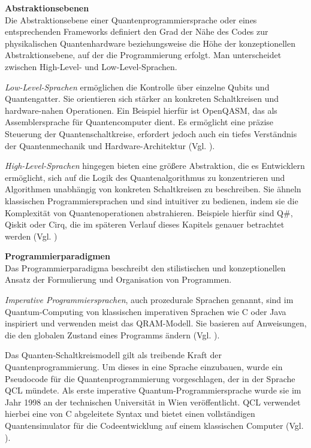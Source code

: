 \textbf{Abstraktionsebenen}\\ 
Die Abstraktionsebene einer Quantenprogrammiersprache oder eines entsprechenden Frameworks definiert den Grad der Nähe des Codes zur physikalischen Quantenhardware beziehungsweise die Höhe der konzeptionellen Abstraktionsebene, auf der die Programmierung erfolgt.
Man unterscheidet zwischen High-Level- und Low-Level-Sprachen. 

\textit{Low-Level-Sprachen} ermöglichen die Kontrolle über einzelne Qubits und Quantengatter. Sie orientieren sich stärker an konkreten Schaltkreisen und hardware-nahen Operationen. Ein Beispiel hierfür ist OpenQASM, das als Assemblersprache für Quantencomputer dient. Es ermöglicht eine präzise Steuerung der Quantenschaltkreise, erfordert jedoch auch ein tiefes Verständnis der Quantenmechanik und Hardware-Architektur (Vgl. \cite{cross_open_2017}).

\textit{High-Level-Sprachen} hingegen bieten eine größere Abstraktion, die es Entwicklern ermöglicht, sich auf die Logik des Quantenalgorithmus zu konzentrieren und Algorithmen unabhängig von konkreten Schaltkreisen zu beschreiben. Sie ähneln klassischen Programmiersprachen und sind intuitiver zu bedienen, indem sie die Komplexität von Quantenoperationen abstrahieren. Beispiele hierfür sind Q\#, Qiskit oder Cirq, die im späteren Verlauf dieses Kapitels genauer betrachtet werden (Vgl. \cite{singh_survey_2024})

\textbf{Programmierparadigmen}\\ 
Das Programmierparadigma beschreibt den stilistischen und konzeptionellen Ansatz der Formulierung und Organisation von Programmen.

\textit{Imperative Programmiersprachen}, auch prozedurale Sprachen genannt, sind im Quantum-Computing von klassischen imperativen Sprachen wie C oder Java inspiriert und verwenden meist das QRAM-Modell. Sie basieren auf Anweisungen, die den globalen Zustand eines Programms ändern (Vgl. \cite{garhwal_quantum_2021}). 

Das Quanten-Schaltkreismodell gilt als treibende Kraft der Quantenprogrammierung. Um dieses in eine Sprache einzubauen, wurde ein Pseudocode für die Quantenprogrammierung vorgeschlagen, der in der Sprache QCL mündete. Als erste imperative Quantum-Programmiersprache wurde sie im Jahr 1998 an der technischen Universität in Wien veröffentlicht. QCL verwendet hierbei eine von C abgeleitete Syntax und bietet einen vollständigen Quantensimulator für die Codeentwicklung auf einem klassischen Computer (Vgl. \cite{sofge_survey_2008}).

